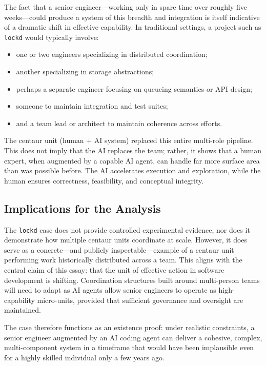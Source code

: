 \documentclass[11pt, a4paper, twocolumn]{article} %
\begin{document}
The fact that a senior engineer---working only in spare time over roughly five
weeks---could produce a system of this breadth and integration is itself
indicative of a dramatic shift in effective capability. In traditional
settings, a project such as \texttt{lockd} would typically involve:
\begin{itemize}
    \item one or two engineers specializing in distributed coordination;
    \item another specializing in storage abstractions;
    \item perhaps a separate engineer focusing on queueing semantics or API
    design;
    \item someone to maintain integration and test suites;
    \item and a team lead or architect to maintain coherence across efforts.
\end{itemize}

The centaur unit (human + AI system) replaced this entire multi-role pipeline.
This does not imply that the AI replaces the team; rather, it shows that a
human expert, when augmented by a capable AI agent, can handle far more surface
area than was possible before. The AI accelerates execution and exploration,
while the human ensures correctness, feasibility, and conceptual integrity.

\subsection*{Implications for the Analysis}

The \texttt{lockd} case does not provide controlled experimental evidence, nor
does it demonstrate how multiple centaur units coordinate at scale. However, it
does serve as a concrete---and publicly inspectable---example of a centaur unit
performing work historically distributed across a team. This aligns with the
central claim of this essay: that the unit of effective action in software
development is shifting. Coordination structures built around multi-person
teams will need to adapt as AI agents allow senior engineers to operate as
high-capability micro-units, provided that sufficient governance and oversight
are maintained.

The case therefore functions as an existence proof: under realistic constraints,
a senior engineer augmented by an AI coding agent can deliver a cohesive,
complex, multi-component system in a timeframe that would have been implausible
even for a highly skilled individual only a few years ago.
\end{document}
